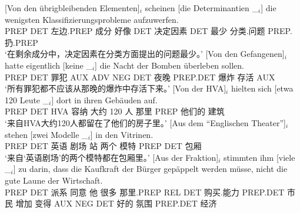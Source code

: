 \begin{sloppypar}
\eal
\ex 
\gll {}[Von den übrigbleibenden Elementen]$_i$ scheinen [die Determinantien \_$_i$] die wenigsten Klassifizierungsprobleme aufzuwerfen.\footnotemark\\
     \spacebr{}PREP DET 左边.PREP 成分 好像 \spacebr{}DET 决定因素 {} DET 最少 分类.问题 PREP.扔.PREP\\
\glt `在剩余成分中，决定因素在分类方面提出的问题最少。'
\ex\label{bsp-von-den-gefangenen} 
\gll {}[Von den Gefangenen]$_i$ hatte eigentlich [keine \_$_i$] die Nacht der Bomben überleben sollen.\footnotemark\\
	 {}\spacebr{}PREP DET 罪犯 AUX ADV \spacebr{}NEG {} DET 夜晚 PREP.DET 爆炸 存活 AUX\\
\glt `所有罪犯都不应该从那晚的爆炸中存活下来。'
\ex 
\gll {}[Von der HVA]$_i$ hielten sich [etwa 120 Leute \_$_i$] dort in ihren Gebäuden auf.\footnotemark\\
	 {}\spacebr{}PREP DET HVA 容纳  \spacebr{}大约 120 人 {} 那里 PREP 他们的 建筑 \prt{}\\
\glt `来自HVA大约120人都留在了他们的房子里。'
\ex 
\gll {}[Aus dem "`Englischen Theater"']$_i$ stehen [zwei Modelle \_$_i$] in den Vitrinen.\footnotemark\hspace{-3pt}\\
	 {}\spacebr{}PREP DET 英语 剧场 站 \spacebr{}两个 模特 {} PREP DET 包厢\\
\glt `来自`英语剧场'的两个模特都在包厢里。'
\ex 
\gll {}[Aus der Fraktion]$_i$ stimmten ihm [viele \_$_i$] zu darin, dass die Kaufkraft der Bürger gepäppelt werden müsse, nicht die gute Laune der Wirtschaft.\footnotemark\\
	 {}\spacebr{}PREP DET 派系 同意 他 \spacebr{}很多 {} \prt{} 那里.PREP REL DET 购买.能力 PREP.DET 市民 增加 变得 AUX NEG DET 好的 氛围 PREP.DET 经济\\
\end{sloppypar}
